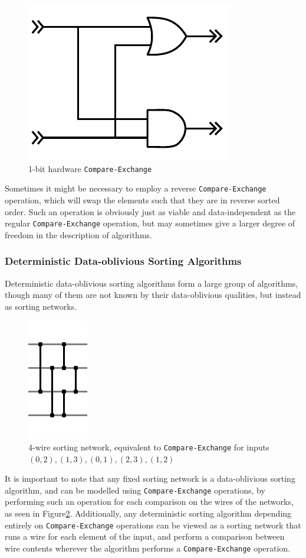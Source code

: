 \begin{figure}
\center
\includegraphics[width= 0.25 \textwidth]{Graphics/1bitCompare.pdf}
\caption{1-bit hardware \texttt{Compare-Exchange}}
\label{fig:bitcompare}
\end{figure}

Sometimes it might be necessary to employ a reverse \texttt{Compare-Exchange} operation, which will swap the elements such that they are in reverse sorted order. Such an operation is obviously just as viable and data-independent as the regular \texttt{Compare-Exchange} operation, but may sometimes give a larger degree of freedom in the description of algorithms.

\subsubsection{Deterministic Data-oblivious Sorting Algorithms}

Deterministic data-oblivious sorting algorithms form a large group of algorithms, though many of them are not known by their data-oblivious qualities, but instead as sorting networks.

\begin{figure}
\center
\includegraphics[width= 0.15 \textwidth]{Graphics/network.png}
\caption{4-wire sorting network, equivalent to \texttt{Compare-Exchange} for inputs $(0,2), (1,3), (0,1), (2,3), (1,2)$}
\label{fig:network}
\end{figure}

It is important to note that any fixed sorting network is a data-oblivious sorting algorithm, and can be modelled using \texttt{Compare-Exchange} operations, by performing such an operation for each comparison on the wires of the networks, as seen in Figure\ref{fig:network}. Additionally, any deterministic sorting algorithm depending entirely on \texttt{Compare-Exchange} operations can be viewed as a sorting network that runs a wire for each element of the input, and perform a comparison between wire contents wherever the algorithm performs a \texttt{Compare-Exchange} operation.

